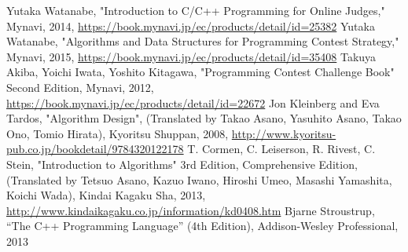 \documentclass[report]{book}
\begin{document}
\begin{thebibliography}{99}
  Yutaka Watanabe, "Introduction to C/C++ Programming for Online Judges," Mynavi, 2014, \url{https://book.mynavi.jp/ec/products/detail/id=25382}
 Yutaka Watanabe, "Algorithms and Data Structures for Programming Contest Strategy," Mynavi, 2015, \url{https://book.mynavi.jp/ec/products/detail/id=35408}
 Takuya Akiba, Yoichi Iwata, Yoshito Kitagawa, "Programming Contest Challenge Book" Second Edition, Mynavi, 2012, \url{https://book.mynavi.jp/ec/products/detail/id=22672}
 Jon Kleinberg and Eva Tardos, "Algorithm Design", (Translated by Takao Asano, Yasuhito Asano, Takao Ono, Tomio Hirata), Kyoritsu Shuppan, 2008, \url{http://www.kyoritsu-pub.co.jp/bookdetail/9784320122178}
 T. Cormen, C. Leiserson, R. Rivest, C. Stein, "Introduction to Algorithms" 3rd Edition, Comprehensive Edition, (Translated by Tetsuo Asano, Kazuo Iwano, Hiroshi Umeo, Masashi Yamashita, Koichi Wada), Kindai Kagaku Sha, 2013, \url{http://www.kindaikagaku.co.jp/information/kd0408.htm}
  Bjarne Stroustrup, ``The C++ Programming Language'' (4th Edition),
  Addison-Wesley Professional, 2013
\end{thebibliography}


\printindex
\end{document}
